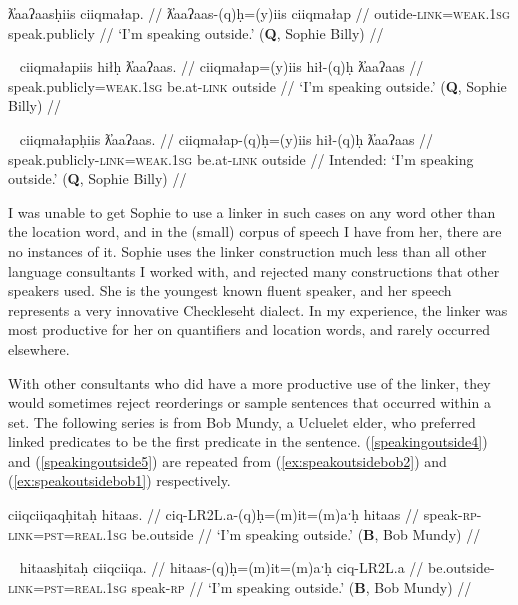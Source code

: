 \ex \label{speakingoutside1}
\begingl
\glpreamble ƛ̓aaʔaasḥiis ciiqmałap. //
\gla ƛ̓aaʔaas-(q)ḥ=(y)iis ciiqmałap //
\glb outide-\textsc{link}=\textsc{weak.1sg} speak.publicly //
\glft `I'm speaking outside.' (\textbf{Q}, Sophie Billy) //
\endgl
\xe

\ex~ \label{speakingoutside2}
\begingl
\glpreamble ciiqmałapiis hiłḥ ƛ̓aaʔaas. //
\gla ciiqmałap=(y)iis hił-(q)ḥ ƛ̓aaʔaas //
\glb speak.publicly=\textsc{weak.1sg} be.at-\textsc{link} outside //
\glft `I'm speaking outside.' (\textbf{Q}, Sophie Billy) //
\endgl
\xe

\ex~ \label{*speakingoutside3}
\begingl
\glpreamble *ciiqmałapḥiis ƛ̓aaʔaas. //
\gla ciiqmałap-(q)ḥ=(y)iis hił-(q)ḥ ƛ̓aaʔaas //
\glb speak.publicly-\textsc{link}=\textsc{weak.1sg} be.at-\textsc{link} outside //
\glft Intended: `I'm speaking outside.' (\textbf{Q}, Sophie Billy) //
\endgl
\xe

I was unable to get Sophie to use a linker in such cases on any word other than the location word, and in the (small) corpus of speech I have from her, there are no instances of it. Sophie uses the linker construction much less than all other language consultants I worked with, and rejected many constructions that other speakers used. She is the youngest known fluent speaker, and her speech represents a very innovative Checkleseht dialect. In my experience, the linker was most productive for her on quantifiers and location words, and rarely occurred elsewhere.

With other consultants who did have a more productive use of the linker, they would sometimes reject reorderings or sample sentences that occurred within a set. The following series is from Bob Mundy, a Ucluelet elder, who preferred linked predicates to be the first predicate in the sentence. (\ref{speakingoutside4}) and (\ref{speakingoutside5}) are repeated from (\ref{ex:speakoutsidebob2}) and (\ref{ex:speakoutsidebob1}) respectively.

\ex \label{speakingoutside4}
\begingl
\glpreamble ciiqciiqaqḥitaḥ hitaas. //
\gla ciq-LR2L.a-(q)ḥ=(m)it=(m)aˑḥ hitaas //
\glb speak-\textsc{rp}-\textsc{link}=\textsc{pst}=\textsc{real.1sg} be.outside //
\glft `I'm speaking outside.' (\textbf{B}, Bob Mundy) //
\endgl
\xe

\ex~ \label{speakingoutside5}
\begingl
\glpreamble hitaasḥitaḥ ciiqciiqa. //
\gla hitaas-(q)ḥ=(m)it=(m)aˑḥ ciq-LR2L.a //
\glb be.outside-\textsc{link}=\textsc{pst}=\textsc{real.1sg} speak-\textsc{rp} //
\glft `I'm speaking outside.' (\textbf{B}, Bob Mundy) //
\endgl
\xe

